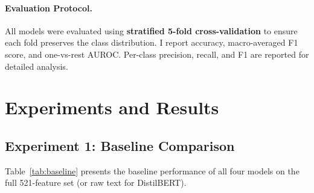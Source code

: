 \documentclass[12pt]{article}
\begin{document}
\paragraph{Evaluation Protocol.}
All models were evaluated using \textbf{stratified 5-fold cross-validation}
to ensure each fold preserves the class distribution. I report
accuracy, macro-averaged F1 score, and one-vs-rest AUROC.
Per-class precision, recall, and F1 are reported for detailed analysis.

\section{Experiments and Results}
\label{sec:experiments}

\subsection{Experiment 1: Baseline Comparison}

Table~\ref{tab:baseline} presents the baseline performance of all four
models on the full 521-feature set (or raw text for DistilBERT).

\begin{table}[htbp]
\centering
\small
\begin{minipage}[t]{0.7\linewidth}
  \centering
  \label{tab:baseline}
\end{minipage}
\end{table}
\end{document}

